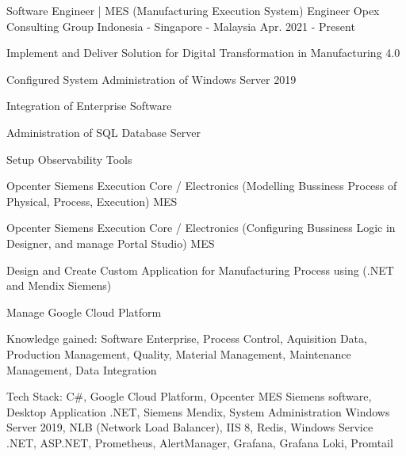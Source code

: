

\begin{cventries}

  \cventry
    {Software Engineer | MES (Manufacturing Execution System) Engineer} %
    {Opex Consulting Group} %
    {Indonesia - Singapore - Malaysia} %
    {Apr. 2021 - Present} %
    {
      \begin{cvitems} %
        \item {Implement and Deliver Solution for Digital Transformation in Manufacturing 4.0}
        \item {Configured System Administration of Windows Server 2019}
        \item {Integration of Enterprise Software}
        \item {Administration of SQL Database Server}
        \item {Setup Observability Tools}
        \item {Opcenter Siemens Execution Core / Electronics (Modelling Bussiness Process of Physical, Process, Execution) MES}
        \item {Opcenter Siemens Execution Core / Electronics (Configuring Bussiness Logic in Designer, and manage Portal Studio) MES}
        \item {Design and Create Custom Application for Manufacturing Process using (.NET and Mendix Siemens)}
        \item {Manage Google Cloud Platform}
        \item {Knowledge gained: Software Enterprise, Process Control, Aquisition Data, Production Management, Quality, Material Management, Maintenance Management, Data Integration}
        \item {Tech Stack: C\#, Google Cloud Platform, Opcenter MES Siemens software, Desktop Application .NET, Siemens Mendix, System Administration Windows Server 2019, NLB (Network Load Balancer), IIS 8, Redis, Windows Service .NET, ASP.NET, Prometheus, AlertManager, Grafana, Grafana Loki, Promtail}
      \end{cvitems}
    }


\end{cventries}
